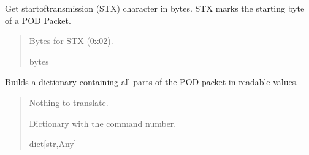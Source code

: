 \documentclass[letterpaper,10pt,english]{sphinxmanual}
\begin{document}
\begin{fulllineitems}
\begin{fulllineitems}
\end{fulllineitems}


\begin{fulllineitems}
\label{\detokenize{Morelia.Packets:Morelia.Packets.Packet.Packet.STX}}
\pysigstartsignatures
{}
\pysigstopsignatures
\sphinxAtStartPar
Get start\sphinxhyphen{}of\sphinxhyphen{}transmission (STX) character in bytes. STX marks the starting byte of a POD Packet.
\begin{quote}\begin{description}
\sphinxAtStartPar
Bytes for STX (0x02).

\sphinxAtStartPar
bytes

\end{description}\end{quote}

\end{fulllineitems}


\begin{fulllineitems}
\label{\detokenize{Morelia.Packets:Morelia.Packets.Packet.Packet.TranslateAll}}
\pysigstartsignatures
{}
\pysigstopsignatures
\sphinxAtStartPar
Builds a dictionary containing all parts of the POD packet in readable values.
\begin{quote}\begin{description}
\sphinxAtStartPar
{} \textendash{} Nothing to translate.

\sphinxAtStartPar
Dictionary with the command number.

\sphinxAtStartPar
dict{[}str,Any{]}

\end{description}\end{quote}


\end{fulllineitems}
\end{fulllineitems}
\end{document}
